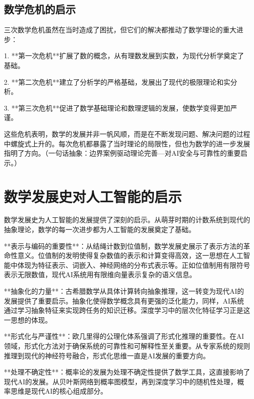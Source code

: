 \subsection{数学危机的启示}


三次数学危机虽然在当时造成了困扰，但它们的解决都推动了数学理论的重大进步：

1. **第一次危机**扩展了数的概念，从有理数发展到实数，为现代分析学奠定了基础。

2. **第二次危机**建立了分析学的严格基础，发展出了现代的极限理论和实分析。

3. **第三次危机**促进了数学基础理论和数理逻辑的发展，使数学变得更加严谨。

这些危机表明，数学的发展并非一帆风顺，而是在不断发现问题、解决问题的过程中螺旋式上升的。每次危机都暴露了当时理论的局限性，但也为数学的进一步发展指明了方向。{（一句话抽象：边界案例驱动理论完善—对AI安全与可靠性的重要启示。）}

\section{数学发展史对人工智能的启示}


数学发展史为人工智能的发展提供了深刻的启示。从萌芽时期的计数系统到现代的抽象理论，数学的每一次进步都为人工智能的发展奠定了基础。

**表示与编码的重要性**：从结绳计数到位值制，数学发展史展示了表示方法的革命性意义。位值制的发明使得复杂数值的表示和计算变得高效，这一思想在人工智能中体现为特征表示、词嵌入、神经网络的分布式表示等。正如位值制用有限符号表示无限数值，现代AI系统用有限维向量表示复杂的语义信息。

**抽象化的力量**：古希腊数学从具体计算转向抽象推理，这一转变为现代AI的发展提供了重要启示。抽象化使得数学概念具有更强的泛化能力，同样，AI系统通过学习抽象特征来实现跨任务的知识迁移。深度学习中的层次化特征学习正是这一思想的体现。

**形式化与严谨性**：欧几里得的公理化体系强调了形式化推理的重要性。在AI领域，形式化方法对于确保系统的可靠性和可解释性至关重要。从专家系统的规则推理到现代的神经符号融合，形式化思维一直是AI发展的重要方向。

**处理不确定性**：概率论的发展为处理不确定性提供了数学工具，这直接影响了现代AI的发展。从贝叶斯网络到概率图模型，再到深度学习中的随机性处理，概率思维是现代AI的核心组成部分。

